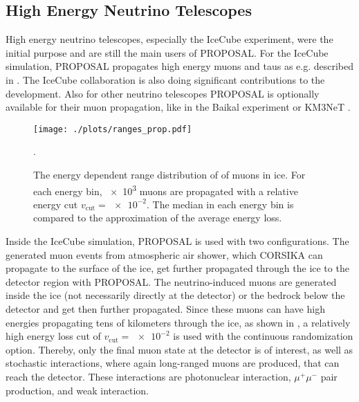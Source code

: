 %

\subsection{High Energy Neutrino Telescopes}

High energy neutrino telescopes, especially the IceCube experiment, were the initial purpose and are still the main users of PROPOSAL.
For the IceCube simulation, PROPOSAL propagates high energy muons and taus as e.g. described in \cite{IceCube2016Aachen}.
The IceCube collaboration is also doing significant contributions to the development.
Also for other neutrino telescopes PROPOSAL is optionally available for their muon propagation, like in the Baikal experiment \cite{Pastircak19Baikal} or KM3NeT \cite{Km3Net2020gSeaGen}.
\begin{figure}
    \centering
    \texttt{[image: ./plots/ranges\_prop.pdf]}
    \caption{The energy dependent range distribution of of muons in ice. For each energy bin, \num{e3} muons are propagated with a relative energy cut $v_{\mathrm{cut}}=\num{e-2}$. The median in each energy bin is compared to the approximation of the average energy loss.}
    \label{fig:prop_range}.
\end{figure}

Inside the IceCube simulation, PROPOSAL is used with two configurations.
The generated muon events from atmospheric air shower, which CORSIKA can propagate to the surface of the ice, get further propagated through the ice to the detector region with PROPOSAL.
The neutrino-induced muons are generated inside the ice (not necessarily directly at the detector) or the bedrock below the detector and get then further propagated.
Since these muons can have high energies propagating tens of kilometers through the ice, as shown in , a relatively high energy loss cut of $v_{\mathrm{cut}} = \num{e-2}$ is used with the continuous randomization option.
Thereby, only the final muon state at the detector is of interest, as well as stochastic interactions, where again long-ranged muons are produced, that can reach the detector.
These interactions are photonuclear interaction, $\mu^+\mu^-$ pair production, and weak interaction.


